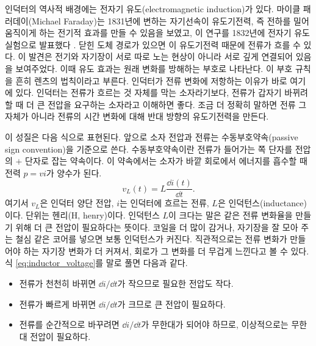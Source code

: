 인덕터의 역사적 배경에는 전자기 유도(electromagnetic induction)가 있다.
마이클 패러데이(Michael Faraday)는 1831년에 변하는 자기선속이 유도기전력, 즉 전하를 밀어 움직이게 하는 전기적 효과를 만들 수 있음을 보였고, 이 연구를 1832년에 전자기 유도 실험으로 발표했다 \cite{faraday1832experimentalresearches}.
닫힌 도체 경로가 있으면 이 유도기전력 때문에 전류가 흐를 수 있다.
이 발견은 전기와 자기장이 서로 따로 노는 현상이 아니라 서로 깊게 연결되어 있음을 보여주었다.
이때 유도 효과는 원래 변화를 방해하는 부호로 나타난다.
이 부호 규칙을 흔히 렌츠의 법칙이라고 부른다.
인덕터가 전류 변화에 저항하는 이유가 바로 여기에 있다.
인덕터는 전류가 흐르는 것 자체를 막는 소자라기보다, 전류가 갑자기 바뀌려 할 때 더 큰 전압을 요구하는 소자라고 이해하면 좋다.
조금 더 정확히 말하면 전류 그 자체가 아니라 전류의 시간 변화에 대해 반대 방향의 유도기전력을 만든다.

이 성질은 다음 식으로 표현된다.
앞으로 소자 전압과 전류는 수동부호약속(passive sign convention)을 기준으로 쓴다.
수동부호약속이란 전류가 들어가는 쪽 단자를 전압의 $+$ 단자로 잡는 약속이다.
이 약속에서는 소자가 바깥 회로에서 에너지를 흡수할 때 전력 $p=vi$가 양수가 된다.
\begin{equation}
  v_L(t) = L\frac{\dd i(t)}{\dd t}.
  \label{eq:inductor_voltage}
\end{equation}
여기서 $v_L$은 인덕터 양단 전압, $i$는 인덕터에 흐르는 전류, $L$은 인덕턴스(inductance)이다.
단위는 헨리(H, henry)이다.
인덕턴스 $L$이 크다는 말은 같은 전류 변화율을 만들기 위해 더 큰 전압이 필요하다는 뜻이다.
코일을 더 많이 감거나, 자기장을 잘 모아 주는 철심 같은 코어를 넣으면 보통 인덕턴스가 커진다.
직관적으로는 전류 변화가 만들어야 하는 자기장 변화가 더 커져서, 회로가 그 변화를 더 무겁게 느낀다고 볼 수 있다.
식 \eqref{eq:inductor_voltage}를 말로 풀면 다음과 같다.

\begin{itemize}
  \item 전류가 천천히 바뀌면 $\dd i/\dd t$가 작으므로 필요한 전압도 작다.
  \item 전류가 빠르게 바뀌면 $\dd i/\dd t$가 크므로 큰 전압이 필요하다.
  \item 전류를 순간적으로 바꾸려면 $\dd i/\dd t$가 무한대가 되어야 하므로, 이상적으로는 무한대 전압이 필요하다.
\end{itemize}

